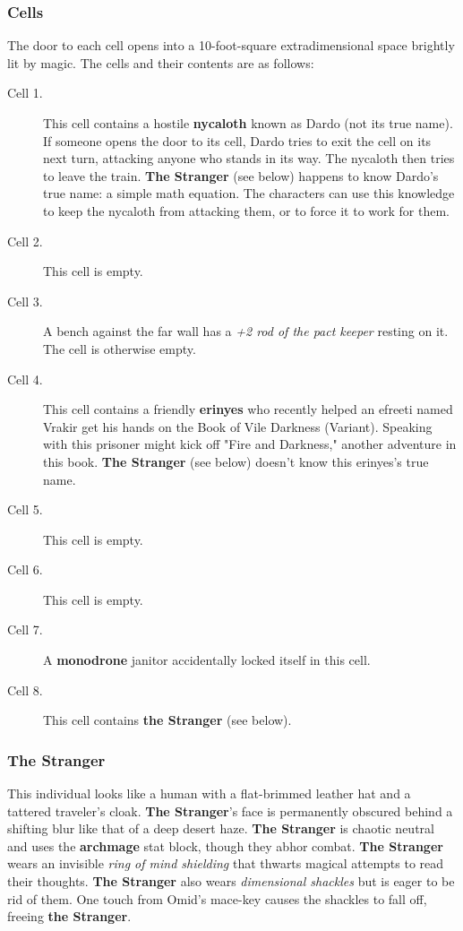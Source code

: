 \documentclass[10pt,a4paper,twoside,bg=print,twocolumn,openany,nodeprecatedcode]{dndbook}
\begin{document}
\subsubsection{Cells}
The door to each cell opens into a 10-foot-square extradimensional space brightly lit by magic. The cells and their contents are as follows:


\begin{description}
\item[Cell 1.]
This cell contains a hostile \textbf{nycaloth} known as Dardo (not its true name). If someone opens the door to its cell, Dardo tries to exit the cell on its next turn, attacking anyone who stands in its way. The nycaloth then tries to leave the train. \textbf{The Stranger} (see below) happens to know Dardo's true name: a simple math equation. The characters can use this knowledge to keep the nycaloth from attacking them, or to force it to work for them.
\item[Cell 2.]
This cell is empty.
\item[Cell 3.]
A bench against the far wall has a \textit{+2 rod of the pact keeper} resting on it. The cell is otherwise empty.
\item[Cell 4.]
This cell contains a friendly \textbf{erinyes} who recently helped an efreeti named Vrakir get his hands on the Book of Vile Darkness (Variant). Speaking with this prisoner might kick off "Fire and Darkness," another adventure in this book. \textbf{The Stranger} (see below) doesn't know this erinyes's true name.
\item[Cell 5.]
This cell is empty.
\item[Cell 6.]
This cell is empty.
\item[Cell 7.]
A \textbf{monodrone} janitor accidentally locked itself in this cell.
\item[Cell 8.]
This cell contains \textbf{the Stranger} (see below).
\end{description}

\subsubsection{The Stranger}
This individual looks like a human with a flat-brimmed leather hat and a tattered traveler's cloak. \textbf{The Stranger}'s face is permanently obscured behind a shifting blur like that of a deep desert haze. \textbf{The Stranger} is chaotic neutral and uses the \textbf{archmage} stat block, though they abhor combat. \textbf{The Stranger} wears an invisible \textit{ring of mind shielding} that thwarts magical attempts to read their thoughts. \textbf{The Stranger} also wears \textit{dimensional shackles} but is eager to be rid of them. One touch from Omid's mace-key causes the shackles to fall off, freeing \textbf{the Stranger}.
\end{document}
